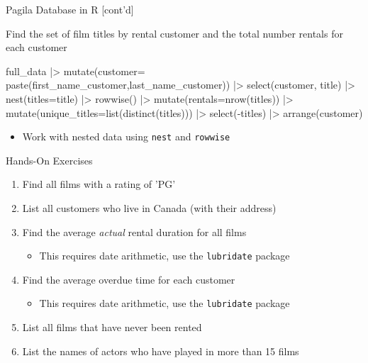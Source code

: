 \documentclass[ignorenonframetext,xcolor=x11names]{beamer}
\begin{document}
\begin{frame}[fragile]{Pagila Database in R \small [cont'd]}

Find the set of film titles by rental customer and the total number rentals for each customer

\footnotesize
\begin{Rcode}
full_data |>
  mutate(customer=
    paste(first_name_customer,last_name_customer)) |>
  select(customer, title) |>
  nest(titles=title) |>
  rowwise() |> 
  mutate(rentals=nrow(titles)) |>
  mutate(unique_titles=list(distinct(titles))) |>
  select(-titles) |>
  arrange(customer)
\end{Rcode}
\normalsize

\begin{itemize}
  \item Work with nested data using \texttt{nest} and \texttt{rowwise}
\end{itemize}
\end{frame}


\begin{frame}{Hands-On Exercises}
\begin{enumerate}
  \item Find all films with a rating of 'PG'
  \item List all customers who live in Canada (with their address)
  \item Find the average \emph{actual} rental duration for all films
  \begin{itemize}
     \item This requires date arithmetic, use the \texttt{lubridate} package
  \end{itemize}
  \item Find the average overdue time for each customer
  \begin{itemize}
     \item This requires date arithmetic, use the \texttt{lubridate} package
  \end{itemize}
  \item List all films that have never been rented
  \item List the names of actors who have played in more than 15 films
\end{enumerate}
\end{frame}
\end{document}
